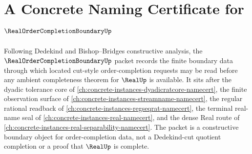 \chapter{A Concrete Naming Certificate for $\RealOrderCompletionBoundaryUp$}
\label{ch:concrete-instances-real-order-completion-boundary-namecert}

Following Dedekind and Bishop--Bridges constructive analysis, the $\RealOrderCompletionBoundaryUp$ packet records the finite boundary data through which located cut-style order-completion requests may be read before any ambient completeness theorem for $\RealUp$ is available. It sits after the dyadic tolerance core of \autoref{ch:concrete-instances-dyadicratcore-namecert}, the finite observation surface of \autoref{ch:concrete-instances-streamname-namecert}, the regular rational readback of \autoref{ch:concrete-instances-regseqrat-namecert}, the terminal real-name seal of \autoref{ch:concrete-instances-real-namecert}, and the dense Real route of \autoref{ch:concrete-instances-real-separability-namecert}. The packet is a constructive boundary object for order-completion data, not a Dedekind-cut quotient completion or a proof that $\RealUp$ is complete.

